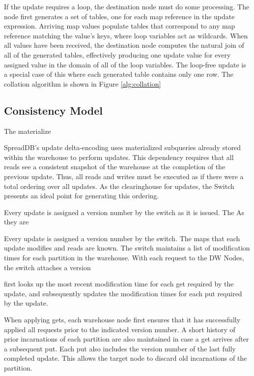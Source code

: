 \documentclass{sig-alternate}
\begin{document}
If the update requires a loop, the destination node must do some processing.  The node first generates a set of tables, one for each map reference in the update expression.  Arriving map values populate tables that correspond to any map reference matching the value's keys, where loop variables act as wildcards.  When all values have been received, the destination node computes the natural join of all of the generated tables, effectively producing one update value for every assigned value in the domain of all of the loop variables.  The loop-free update is a special case of this where each generated table contains only one row.  The collation algorithm is shown in Figure \ref{alg:collation}

\subsection{Consistency Model}

The materialize

SpreadDB's update delta-encoding uses materialized subqueries already stored within the warehouse to perform updates.  This dependency requires that all reads see a consistent snapshot of the warehouse at the completion of the previous update.  Thus, all reads and writes must be executed as if there were a total ordering over all updates.  As the clearinghouse for updates, the Switch presents an ideal point for generating this ordering.  

Every update is assigned a version number by the switch as it is issued.  The 
As they are 

Every update is assigned a version number by the switch.  The maps that each update modifies and reads are known.  The switch maintains a list of modification times for each partition in the warehouse.  With each request to the DW Nodes, the switch attaches a version 

 first looks up the most recent modification time for each get required by the update, and subsequently updates the modification times for each put required by the update.  

When applying gets, each warehouse node first ensures that it has successfully applied all requests prior to the indicated version number.  A short history of prior incarnations of each partition are also maintained in case a get arrives after a subsequent put.  Each put also includes the version number of the last fully completed update.  This allows the target node to discard old incarnations of the partition.
\end{document}
